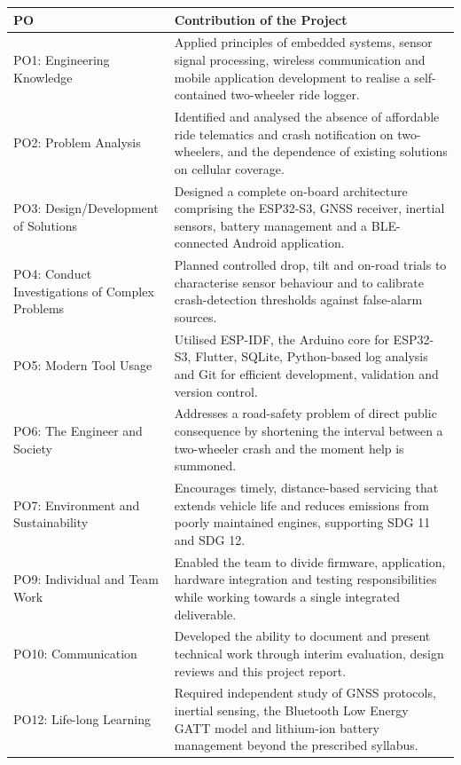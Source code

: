 \documentclass[12pt,a4paper,oneside]{report}
\begin{document}
\vspace{1.2em}
\begin{center}
\begin{singlespace}
\small
\renewcommand{\arraystretch}{1.3}
\begin{tabular}{|L{1.3in}|J{3.5in}|}
\hline
\textbf{PO} & \textbf{Contribution of the Project}\\
\hline
PO1: Engineering Knowledge & Applied principles of embedded systems, sensor signal
processing, wireless communication and mobile application development to realise a
self-contained two-wheeler ride logger.\\
\hline
PO2: Problem Analysis & Identified and analysed the absence of affordable ride telematics
and crash notification on two-wheelers, and the dependence of existing solutions on
cellular coverage.\\
\hline
PO3: Design/Development of Solutions & Designed a complete on-board architecture comprising
the ESP32-S3, GNSS receiver, inertial sensors, battery management and a BLE-connected
Android application.\\
\hline
PO4: Conduct Investigations of Complex Problems & Planned controlled drop, tilt and on-road
trials to characterise sensor behaviour and to calibrate crash-detection thresholds against
false-alarm sources.\\
\hline
PO5: Modern Tool Usage & Utilised ESP-IDF, the Arduino core for ESP32-S3, Flutter, SQLite,
Python-based log analysis and Git for efficient development, validation and version
control.\\
\hline
PO6: The Engineer and Society & Addresses a road-safety problem of direct public
consequence by shortening the interval between a two-wheeler crash and the moment help is
summoned.\\
\hline
PO7: Environment and Sustainability & Encourages timely, distance-based servicing that
extends vehicle life and reduces emissions from poorly maintained engines, supporting
SDG 11 and SDG 12.\\
\hline
PO9: Individual and Team Work & Enabled the team to divide firmware, application, hardware
integration and testing responsibilities while working towards a single integrated
deliverable.\\
\hline
PO10: Communication & Developed the ability to document and present technical work through
interim evaluation, design reviews and this project report.\\
\hline
PO12: Life-long Learning & Required independent study of GNSS protocols, inertial sensing,
the Bluetooth Low Energy GATT model and lithium-ion battery management beyond the
prescribed syllabus.\\
\hline
\end{tabular}
\end{singlespace}
\end{center}
\clearpage
\end{document}
